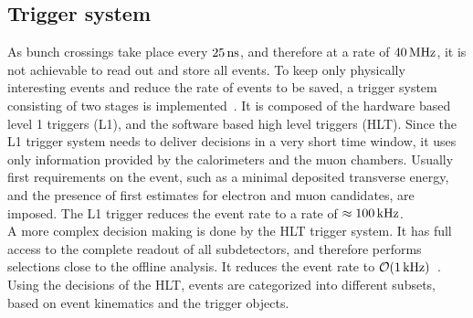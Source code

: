 \subsection{Trigger system}
As bunch crossings take place every $25\,\text{ns}$, and therefore at a rate of $40\,\text{MHz}$, it is not achievable to read out and store all events. To keep only physically interesting events and reduce the rate of events to be saved, a trigger system consisting of two stages is implemented~\cite{TriggerSystem}. It is composed of the hardware based level 1 triggers (L1), and the software based high level triggers (HLT). Since the L1 trigger system needs to deliver decisions in a very short time window, it uses only information provided by the calorimeters and the muon chambers. Usually first requirements on the event, such as a minimal deposited transverse energy, and  the presence of first estimates for electron and muon candidates, are imposed. The L1 trigger reduces the event rate to a rate of $\approx100\,\text{kHz}$.\\
A more complex decision making is done by the HLT trigger system. It has full access to the complete readout of all subdetectors, and therefore performs selections close to the offline analysis. It reduces the event rate to $\mathcal{O}(1\,\text{kHz})$~\cite{TriggerRate}.\\
Using the decisions of the HLT, events are categorized into different subsets, based on event kinematics and the trigger objects.
